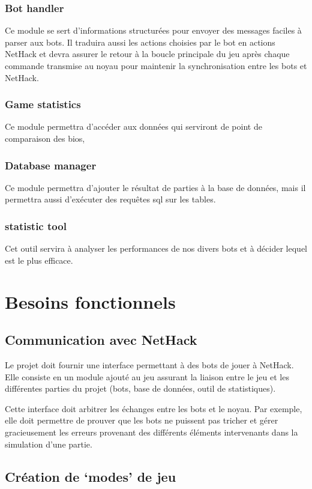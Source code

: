 \documentclass[12pt]{article}
\begin{document}
\subsubsection*{Bot handler}
Ce module se sert d'informations structurées pour envoyer des messages faciles
à parser aux bots. Il traduira aussi les actions choisies par le bot en
actions NetHack et devra assurer le retour à la boucle principale du jeu après
chaque commande transmise au noyau pour maintenir la synchronisation entre les
bots et NetHack.
\subsubsection*{Game statistics}
Ce module permettra d'accéder aux données qui serviront de point de comparaison des bios,
\subsubsection*{Database manager}
Ce module permettra d'ajouter le résultat de parties à la base de données, mais il permettra aussi d'exécuter des requêtes sql sur les tables.
\subsubsection*{statistic tool}
Cet outil servira à analyser les performances de nos divers bots et à décider lequel est le plus efficace.


\section{Besoins fonctionnels}

\subsection{Communication avec NetHack}

Le projet doit fournir une interface permettant à des bots de jouer à NetHack. Elle consiste en un module ajouté au jeu assurant la liaison entre le jeu et les différentes parties du projet (bots, base de données, outil de statistiques).

Cette interface doit arbitrer les échanges entre les bots et le noyau. Par exemple, elle doit permettre de prouver que les bots ne puissent pas tricher et gérer gracieusement les erreurs provenant des différents éléments intervenants dans la simulation d'une partie.

\subsection{Création de `modes' de jeu}
\end{document}
